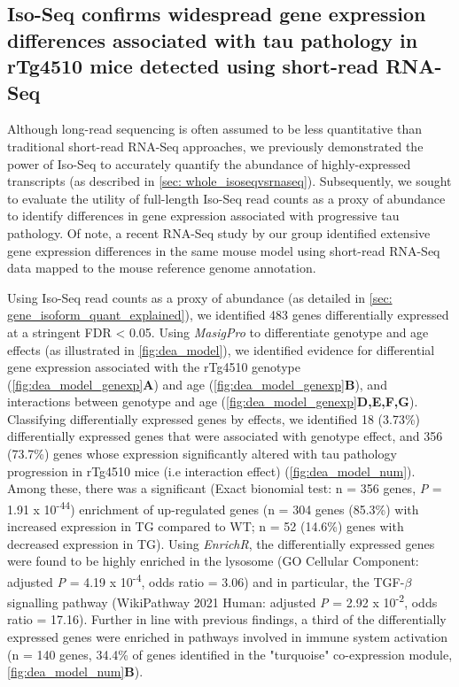 \subsection{Iso-Seq confirms widespread gene expression differences associated with tau pathology in rTg4510 mice detected using short-read RNA-Seq}
\label{ch5: diffgeneexp}
Although long-read sequencing is often assumed to be less quantitative than traditional short-read RNA-Seq approaches, we previously demonstrated the power of Iso-Seq to accurately quantify the abundance of highly-expressed transcripts (as described in \cref{sec: whole_isoseqvsrnaseq}). Subsequently, we sought to evaluate the utility of full-length Iso-Seq read counts as a proxy of abundance to identify differences in gene expression associated with progressive tau pathology. Of note, a recent RNA-Seq study by our group identified extensive gene expression differences in the same mouse model using short-read RNA-Seq data mapped to the mouse reference genome annotation\cite{Castanho2020}.

Using Iso-Seq read counts as a proxy of abundance (as detailed in \cref{sec: gene_isoform_quant_explained}), we identified 483 genes differentially expressed at a stringent FDR < 0.05. Using \textit{MasigPro} to differentiate genotype and age effects (as illustrated in \cref{fig:dea_model}), we identified evidence for differential gene expression associated with the rTg4510 genotype (\cref{fig:dea_model_genexp}\textbf{A}) and age (\cref{fig:dea_model_genexp}\textbf{B}), and interactions between genotype and age (\cref{fig:dea_model_genexp}\textbf{D,E,F,G}). Classifying differentially expressed genes by effects, we identified 18 (3.73\%) differentially expressed genes that were associated with genotype effect, and 356 (73.7\%) genes whose expression significantly altered with tau pathology progression in rTg4510 mice (i.e interaction effect) (\cref{fig:dea_model_num}). Among these, there was a significant (Exact bionomial test: n = 356 genes, \textit{P} = 1.91 x 10\textsuperscript{-44}) enrichment of up-regulated genes (n = 304 genes (85.3\%) with increased expression in TG compared to WT; n = 52 (14.6\%) genes with decreased expression in TG). Using \textit{EnrichR}, the differentially expressed genes were found to be highly enriched in the lysosome (GO Cellular Component: adjusted \textit{P} = 4.19 x 10\textsuperscript{-4}, odds ratio = 3.06) and in particular, the TGF-$\beta$  signalling pathway (WikiPathway 2021 Human: adjusted \textit{P} = 2.92 x 10\textsuperscript{-2}, odds ratio = 17.16). Further in line with previous findings, a third of the differentially expressed genes were enriched in pathways involved in immune system activation (n = 140 genes, 34.4\% of genes identified in the "turquoise" co-expression module\cite{Castanho2020}, \cref{fig:dea_model_num}\textbf{B}). 

